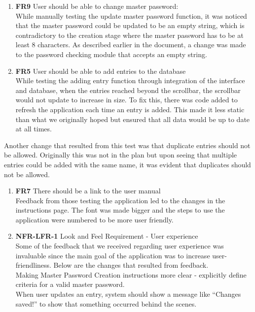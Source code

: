 \documentclass[12pt, titlepage]{article}
\begin{document}
	\begin{enumerate}

		\item \textbf{FR9} User should be able to change master password:\\
		While manually testing the update master password function, it was noticed that the master password could be updated to be an empty string, which is contradictory to the creation stage where the master password has to be at least 8 characters. As described earlier in the document, a change was made to the password checking module that accepts an empty string.
	
		\item \textbf{FR5} User should be able to add entries to the database\\
		While testing the adding entry function through integration of the interface and database, when the entries reached beyond the scrollbar, the scrollbar would not update to increase in size. To fix this, there was code added to refresh the application each time an entry is added. This made it less static than what we originally hoped but ensured that all data would be up to date at all times.

	\end{enumerate}

	\noindent
	Another change that resulted from this test was that duplicate entries should not be allowed. Originally this was not in the plan but upon seeing that multiple entries could be added with the same name, it was evident that duplicates should not be allowed.
	
	\begin{enumerate}[resume]

		\item \textbf{FR7} There should be a link to the user manual\\
		Feedback from those testing the application led to the changes in the instructions page. The font was made bigger and the steps to use the application were numbered to be more user friendly.
	
		\item \textbf{NFR-LFR-1} Look and Feel Requirement - User experience\\
		Some of the feedback that we received regarding user experience was invaluable since the main goal of the application was to increase user-friendliness. Below are the changes that resulted from feedback.\\
		Making Master Password Creation instructions more clear - explicitly define criteria for a valid master password.\\
		When user updates an entry, system should show a message like “Changes saved!” to show that something occurred behind the scenes.

	\end{enumerate}
\end{document}
